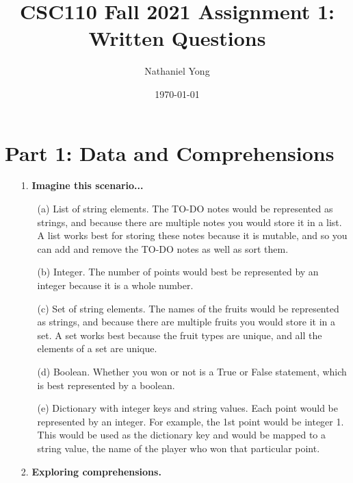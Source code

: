 \documentclass[fontsize=11pt]{article}
\title{CSC110 Fall 2021 Assignment 1: Written Questions}
\author{Nathaniel Yong}
\date{\today}
\begin{document}
\maketitle

\section*{Part 1: Data and Comprehensions}

\begin{enumerate}
\item[1.] \textbf{Imagine this scenario...}
\begin{enumerate}
\item[(a)]
List of string elements. The TO-DO notes would be represented as strings, and because there are multiple notes you would store it in a list. A list works best for storing these notes because it is mutable, and so you can add and remove the TO-DO notes as well as sort them.

\item[(b)]
Integer. The number of points would best be represented by an integer because it is a whole number.

\item[(c)]
Set of string elements. The names of the fruits would be represented as strings, and because there are multiple fruits you would store it in a set. A set works best because the fruit types are unique, and all the elements of a set are unique.

\item[(d)]
Boolean. Whether you won or not is a True or False statement, which is best represented by a boolean.

\item[(e)]
Dictionary with integer keys and string values. Each point would be represented by an integer. For example, the 1st point would be integer 1. This would be used as the dictionary key and would be mapped to a string value, the name of the player who won that particular point. 
\end{enumerate}

\item[2.] \textbf{Exploring comprehensions.}


\end{enumerate}
\end{document}
